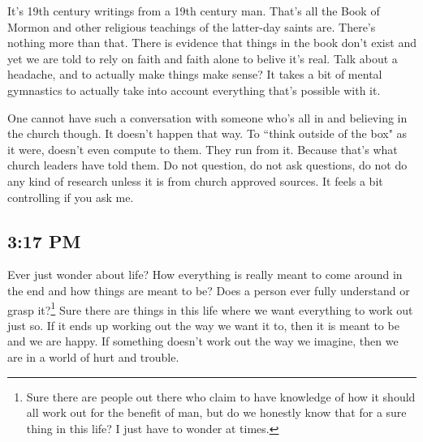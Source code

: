It's 19th century writings from a 19th century man. That's all the Book of Mormon and
other religious teachings of the latter-day saints are. There's nothing more than
that. There is evidence that things in the book don't exist and yet we are told to
rely on faith and faith alone to belive it's real. Talk about a headache, and to
actually make things make sense? It takes a bit of mental gymnastics to actually take
into account everything that's possible with it.

One cannot have such a conversation with someone who's all in and believing in the
church though. It doesn't happen that way. To ``think outside of the box" as it were,
doesn't even compute to them. They run from it. Because that's what church leaders
have told them. Do not question, do not ask questions, do not do any kind of research
unless it is from church approved sources. It feels a bit controlling if you ask me.

\subsection{3:17 PM}

Ever just wonder about life? How everything is really meant to come around in the end
and how things are meant to be? Does a person ever fully understand or grasp
it?\footnote{Sure there are people out there who claim to have knowledge of how it 
should all work out for the benefit of man, but do we honestly know that for a sure
thing in this life? I just have to wonder at times.} Sure there are things in this
life where we want everything to work out just so. If it ends up working out the way
we want it to, then it is meant to be and we are happy. If something doesn't work out
the way we imagine, then we are in a world of hurt and trouble.
